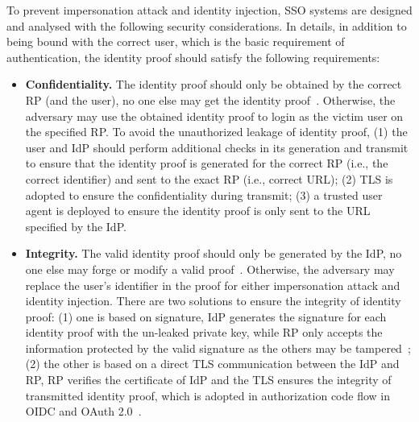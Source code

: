 To prevent impersonation attack and identity injection, SSO systems are designed and analysed with the following security considerations. In details, in addition to being bound with the correct user, which is the basic requirement of authentication,  the identity proof should satisfy the following requirements:
\begin{itemize}
    \item \textbf{Confidentiality.} The identity proof should only be obtained by the correct RP (and the user), no one else may get the identity proof~\cite{ChenPCTKT14,FettKS16,WangZLG16}. Otherwise, the adversary may use the obtained identity proof to login as the victim user on the specified RP. To avoid the unauthorized leakage of identity proof, (1) the  user and IdP should perform additional checks  in its generation and transmit to ensure that the identity proof is generated for the correct RP (i.e., the correct identifier) and sent to the exact RP (i.e., correct URL); (2) TLS is adopted to ensure the confidentiality during transmit; (3) a trusted user agent is deployed to ensure the identity proof is only sent to the URL specified by the IdP.
    \item  \textbf{Integrity.} The valid identity proof should only be generated by the IdP, no one else may forge or modify a valid proof~\cite{WangZLG16}. Otherwise, the adversary may replace the user's identifier in the proof for either impersonation attack and identity injection. 
        There are two solutions to ensure the integrity of identity proof: (1) one is based on signature, IdP generates the signature  for each identity proof with the un-leaked private key, while RP  only accepts the information protected by the valid signature as the others may be tampered~\cite{WangCW12, SomorovskyMSKJ12}; (2) the other is based on a direct TLS communication between the IdP and RP, RP verifies the certificate of IdP and the TLS ensures the integrity of transmitted identity proof, which is adopted in authorization code flow in OIDC and OAuth 2.0~\cite{ChenPCTKT14}.  

\end{itemize}
